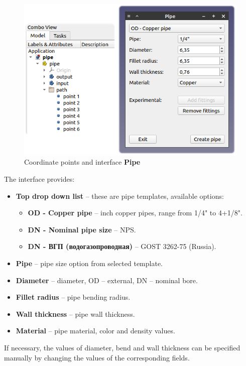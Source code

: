 \documentclass[a4paper,12pt]{article}
\begin{document}
\begin{figure}[htp]
	\centering
	\includegraphics[scale=1]{img/pipe.png}
	\caption{Coordinate points and interface \textbf{Pipe}}
	\label{sec:pipe}
\end{figure}

The interface provides:
\begin{itemize}
	\item \textbf{Top drop down list} -- these are pipe templates, available options:
	\begin{itemize}
		\item \textbf{OD - Copper pipe} -- inch copper pipes, range from 1/4" to 4+1/8".
		\item \textbf{DN - Nominal pipe size} -- NPS.
		\item \textbf{DN - ВГП (водогазопроводная)} -- GOST 3262-75 (Russia).
	\end{itemize}
	\item \textbf{Pipe} -- pipe size option from selected template.
	\item \textbf{Diameter} -- diameter, OD -- external, DN -- nominal bore.
	\item \textbf{Fillet radius} -- pipe bending radius.
	\item \textbf{Wall thickness} -- pipe wall thickness.
	\item \textbf{Material} -- pipe material, color and density values.
\end{itemize}

If necessary, the values ​​of diameter, bend and wall thickness can be specified manually by changing the values ​​of the corresponding fields.\\
\end{document}
